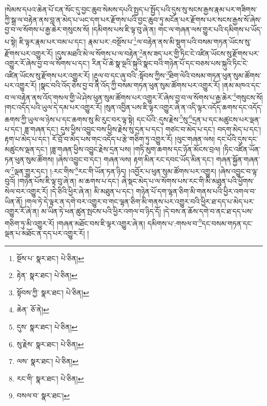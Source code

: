 །སེམས་དཔའ་ཆེན་པོ་ངན་སོང་དུ་བྱང་ཆུབ་སེམས་དཔའི་སྤྱད་པ་སྤྱོད་པའི་དུས་སུ་སངས་རྒྱས་རྣམ་པར་གཟིགས་ཀྱི་སྒྲ་ལ་བརྟེན་ནས་བླ་ན་མེད་པ་ཡང་དག་པར་རྫོགས་པའི་བྱང་ཆུབ་ཏུ་མངོན་པར་རྫོགས་པར་སངས་རྒྱས་སོ་ཞེས་བྱ་བ་ལ་སོགས་པ་རྒྱ་ཆེར་གསུངས་སོ། །དམིགས་པས་ཇི་ལྟ་བུ་ཞེ་ན། གང་ལ་གཞན་ལས་གྱུར་པའི་དམིགས་པ་ཡོད་པ་སྟེ། ཇི་ལྟར་རྣམ་པར་བམ་པ་དང་། རྣམ་པར་:བསྔོས་པ་\footnote{སྔོས་པ་  སྣར་ཐང་།  པེ་ཅིན། }ལ་བརྟེན་ནས་མི་སྡུག་པའི་བསམ་གཏན་ཡོངས་སུ་རྫོགས་པར་འགྱུར་རོ། །དུས་མཐའི་མེ་ལ་སོགས་པ་ལ་བརྟེན་\footnote{རྟེན་  སྣར་ཐང་།  པེ་ཅིན། }ནས་ཟད་པར་གྱི་ཏིང་ངེ་འཛིན་ཡོངས་སུ་རྫོགས་པར་འགྱུར་རོ་ཞེས་བྱ་བ་ལ་སོགས་པ་དང་། རིན་པོ་ཆེ་སྣ་ལྔའི་སྐུའི་སྣང་བའི་གཉེན་པོ་དང་བཅས་པས་སྐུའི་ཏིང་ངེ་འཛིན་ཡོངས་སུ་རྫོགས་པར་འགྱུར་རོ། །རྔུལ་བ་དང་ཞུ་བའི་:སྟོབས་ཀྱིས་\footnote{སྟོབས་ཀྱི་  སྣར་ཐང་།  པེ་ཅིན། }ཐིག་ལེའི་བསམ་གཏན་ཕུན་སུམ་ཚོགས་པར་འགྱུར་རོ། །སྣང་བའི་འོད་ཅེས་བྱ་བ་ནི་འོད་ཀྱི་བསམ་གཏན་ཕུན་སུམ་ཚོགས་པར་འགྱུར་རོ། །ནམ་མཁའ་དང་བ་ལ་བརྟེན་ནས་འོད་གསལ་གྱི་ཡེ་ཤེས་ཕུན་སུམ་ཚོགས་པར་འགྱུར་རོ་ཞེས་བྱ་བ་ལ་སོགས་པ་རྒྱ་ཆེར་\footnote{ཆེན་  ཅོ་ནེ། }གསུངས་སོ། །གང་འདོད་པའི་ཡུལ་དེ་དམ་པར་འགྱུར་རོ། །སུན་འབྱིན་པས་ཇི་ལྟར་འགྱུར་ཞེ་ན་འདི་ལྟར་འདོད་ཆགས་དང་འདོད་ཆགས་ཀྱི་ཡུལ་ལ་ཉེས་པ་དང་ཆགས་སུ་མི་རུང་བར་ལྟ་སྟེ། དང་པོའི་:དུས་རྗེས་\footnote{དུས་  སྣར་ཐང་།  པེ་ཅིན། }སུ་\footnote{སུ་རྗེས་  སྣར་ཐང་།  པེ་ཅིན། }དྲན་པ་དང་མཚུངས་པར་ལྡན་པ་དང་། ཟླ་གཞན་དང་། དུས་ཕྱིས་འབྱུང་བས་ཕྱིས་རྗེས་སུ་དྲན་པ་དང་། གཙང་བ་མེད་པ་དང་། བདག་མེད་པ་དང་། རྟག་པ་མེད་པ་དང་། རོ་བྲོ་བ་མེད་པས་གང་འདོད་པ་རྩེ་གཅིག་ཏུ་འགྱུར་རོ། །ལུང་གཞན་ལས། དང་པོའི་དུས་དང་མཚུངས་ལྡན་དང་། །ཟླ་གཞན་ཕྱིས་འབྱུང་རྗེས་དྲན་པས། །གཏི་མུག་ཆགས་དང་ཉོན་མོངས་བྲལ། །ཏིང་འཛིན་ཡོན་ཏན་ཕུན་སུམ་ཚོགས། །ཞེས་འབྱུང་བ་དང་། གཞན་ལས། རྟག་མིན་རང་དབང་ཡོད་མིན་དང་། གཞན་སྐྱོན་གཞན་ལ་\footnote{ལས་  སྣར་ཐང་།  པེ་ཅིན། }ལྡན་གྱུར་དང་། །:རང་གིས་\footnote{རང་གི་  སྣར་ཐང་།  པེ་ཅིན། }རང་གི་ཡོན་ཏན་ཉིད། །འབྱོར་པ་ཕུན་སུམ་ཚོགས་པར་འགྱུར། །ཞེས་འབྱུང་བ་ལྟ་བུའོ། །གཉེན་པོས་ཇི་ལྟ་བུ་ཞེ་ན། མ་ཆགས་པ་དང་། ཞེ་སྡང་མེད་པ་ལ་སོགས་པས་རང་གི་མི་མཐུན་པའི་ཕྱོགས་སེལ་བར་འགྱུར་རོ། །དེ་ཅིའི་ཕྱིར་ཞེ་ན། མི་མཐུན་པ་དང་། གཉེན་པོ་དག་ལྷན་ཅིག་མི་གནས་པའི་ཕྱིར་འགལ་བ་ཡིན་ནོ། །གལ་ཏེ་དེ་ལྟར་ན་དགེ་བར་འགྱུར་བ་གང་ལྷན་ཅིག་མི་གནས་པར་འགྱུར་བའི་ཕྱིར་ཐ་དད་པ་མེད་པར་འགྱུར་རོ་ཞེ་ན། མ་ཡིན་ཏེ་ཕན་ཚུན་སྤངས་པའི་ཕྱིར་འགལ་བ་ཉིད་དོ། །དེ་བས་ན་ཆོས་དགེ་བ་ནང་ཐ་དད་པས་གཅིག་ཏུ་མི་འགྱུར་རོ། །གཞན་མཐོང་བས་ཇི་ལྟར་འགྱུར་ཞེ་ན། དམིགས་པ་:གསལ་བ་\footnote{བསལ་བ་  སྣར་ཐང་། }དང་བསམ་གཏན་དང་ལྡན་པ་མཐོང་ན་དད་པར་འགྱུར་རོ། །
